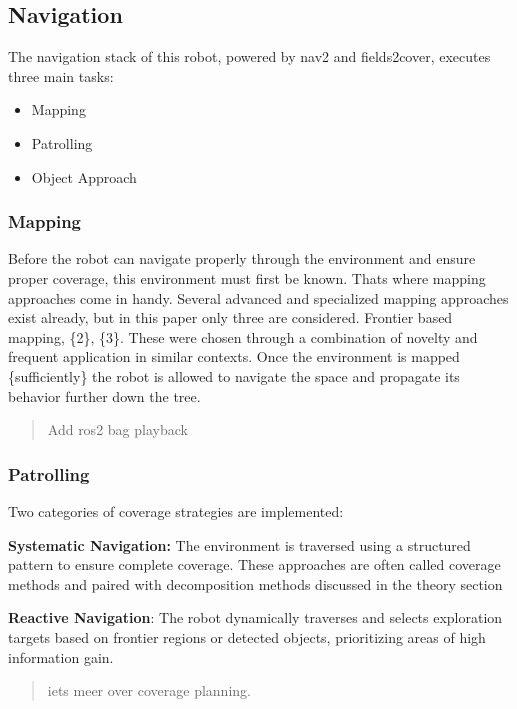 \begin{paracol}
\subsection{Navigation}

The navigation stack of this robot, powered by nav2 and fields2cover, executes three main tasks:

\begin{itemize}
\item Mapping
\item Patrolling
\item Object Approach
\end{itemize}

\subsubsection{Mapping}

Before the robot can navigate properly through the environment and ensure proper coverage, this environment must first be known. Thats where mapping approaches come in handy. Several advanced and specialized mapping approaches exist already, but in this paper only three are considered. Frontier based mapping, \{2\}, \{3\}. These were chosen through a combination of novelty and frequent application in similar contexts. Once the environment is mapped \{sufficiently\} the robot is allowed to navigate the space and propagate its behavior further down the tree.

\begin{quote}
Add ros2 bag playback
\end{quote}

\switchcolumn
\newpage
\subsubsection{Patrolling}

Two categories of coverage strategies are implemented:

\textbf{Systematic Navigation:} The environment is traversed using a structured pattern to ensure complete coverage. These approaches are often called coverage methods and paired with decomposition methods discussed in the theory section

\textbf{Reactive Navigation}: The robot dynamically traverses and selects exploration targets based on frontier regions or detected objects, prioritizing areas of high information gain.

\begin{quote}
iets meer over coverage planning.
\end{quote}


\end{paracol}

